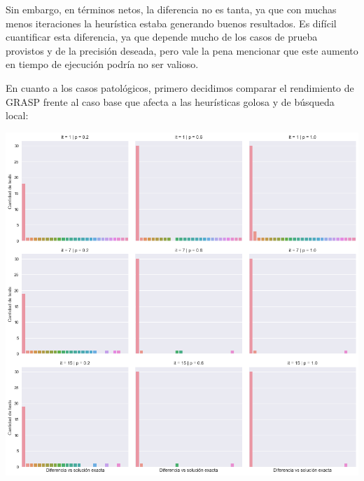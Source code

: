 Sin embargo, en términos netos, la diferencia no es tanta, ya que con muchas menos iteraciones la heurística estaba generando buenos resultados. Es difícil cuantificar esta diferencia, ya que depende mucho de los casos de prueba provistos y de la precisión deseada, pero vale la pena mencionar que este aumento en tiempo de ejecución podría no ser valioso.

En cuanto a los casos patológicos, primero decidimos comparar el rendimiento de GRASP frente al caso base que afecta a las heurísticas golosa y de búsqueda local:

\begin{center}
    \includegraphics[scale=0.6]{img/path-grasp-3x3.png}


\end{center}
